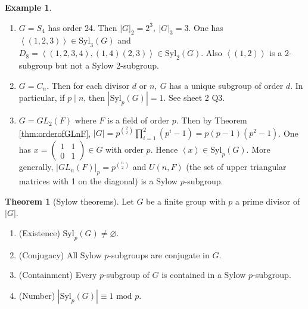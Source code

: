 \documentclass[a4paper]{article}
\newcommand{\la}{\left\langle}
\newcommand{\ra}{\right\rangle}
\newcommand{\Syl}{\text{Syl}}
\newcommand{\Mod}{\text{ mod }}
\theoremstyle{definition}
\newtheorem{thm}[defn]{Theorem}
\newtheorem{example}[defn]{Example}
\begin{document}
\begin{example}
\begin{enumerate}
\item $G=S_4$ has order 24. Then $|G|_2=2^3,\ |G|_3=3$. One has $\la (1,2,3)\ra\in\Syl_3(G)$ and $D_8=\la (1,2,3,4),(1,4)(2,3)\ra\in\Syl_2(G)$. Also $\la(1,2)\ra$ is a 2-subgroup but not a Sylow 2-subgroup.
\item $G=C_n$. Then for each divisor $d$ or $n,\ G$ has a unique subgroup of order $d$. In particular, if $p\mid n$, then $|\Syl_p(G)|=1$. See sheet 2 Q3.
\item $G=GL_2(F)$ where $F$ is a field of order $p$. Then by Theorem \ref{thm:orderofGLnF}, $|G|=p^{\binom{2}{2}} \prod_{i=1}^2(p^i-1)=p(p-1)(p^2-1)$. One has $x=\begin{pmatrix}1&1\\0&1\end{pmatrix}\in G$ with order $p$. Hence $\la x\ra \in \Syl_p(G)$. More generally, $|GL_n(F)|_p=p^{\binom{n}{2}}$ and $U(n,F)$ (the set of upper triangular matrices with 1 on the diagonal) is a Sylow $p$-subgroup.
\end{enumerate}
\end{example}

\begin{thm}[Sylow theorems]
Let $G$ be a finite group with $p$ a prime divisor of $|G|$.
\begin{enumerate}
\item (Existence) $\Syl_p(G)\neq\varnothing$.
\item (Conjugacy) All Sylow $p$-subgroups are conjugate in $G$.
\item (Containment) Every $p$-subgroup of $G$ is contained in a Sylow $p$-subgroup.
\item (Number) $|\Syl_p(G)|\equiv 1\Mod p$.
\end{enumerate}
\end{thm}
\end{document}

